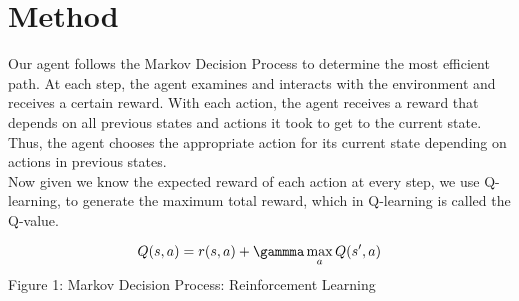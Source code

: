\documentclass{article}
\begin{document}
\section{Method}

Our agent follows the Markov Decision Process to determine the most efficient path. At each step, the agent examines and interacts with the environment and receives a certain reward. With each action, the agent receives a reward that depends on all previous states and actions it took to get to the current state. Thus, the agent chooses the appropriate action for its current state depending on actions in previous states. \\
Now given we know the expected reward of each action at every step, we use Q-learning, to generate the maximum total reward, which in Q-learning is called the Q-value. 

\begin{center}
    \[Q(s,a) = r(s,a) + \gammma \max_{a} Q(s', a)\]
    \center Figure 1: Markov Decision Process: Reinforcement Learning
\end{center}
\end{document}
